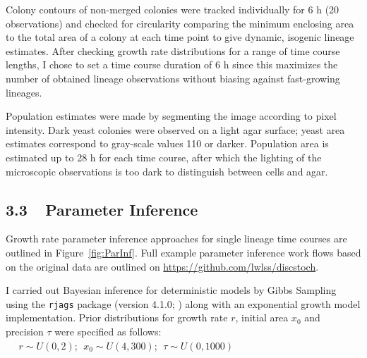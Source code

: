 \documentclass{bioinfo}
\begin{document}
{Colony contours of non-merged colonies were tracked individually for 6 h (20 observations) and checked for circularity comparing the minimum enclosing area to the total area of a colony at each time point to give dynamic, isogenic lineage estimates. 
After checking growth rate distributions for a range of time course lengths, I chose to set a time course duration of 6 h since this maximizes the number of obtained lineage observations without biasing against fast-growing lineages. 

Population estimates were made by segmenting the image according to pixel intensity. Dark yeast colonies were observed on a light agar surface; yeast area estimates correspond to gray-scale values 110 or darker. Population area is estimated up to 28 h for each time course, after which the lighting of the microscopic observations is too dark to distinguish between cells and agar. 

\vspace{-0.5em}
\subsection*{3.3 $\>\>$ Parameter Inference}

Growth rate parameter inference approaches for single lineage time courses are outlined in Figure~\ref{fig:ParInf}. Full example parameter inference work flows based on the original data are outlined on \href{https://github.com/lwlss/discstoch}{https://github.com/lwlss/discstoch}. 

I carried out Bayesian inference for deterministic models by Gibbs Sampling using the \texttt{rjags} package (version 4.1.0; \citealp{Plummer16}) along with an exponential growth model implementation. Prior distributions for growth rate $r$, initial area $x_0$ and precision $\tau$ were specified as follows: \\

$ \>\>\>\>\>\> r\sim U(0,2); \>\>
x_0\sim U(4,300); \>\>
\tau \sim U(0,1000) $\\

}
\end{document}
